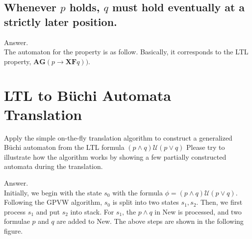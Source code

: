 \documentclass[a4paper,11pt]{article}
\theoremstyle{mytheor}
\begin{document}
\subsection{Whenever $p$ holds, $q$ must hold eventually at a strictly later position.}
Answer.
\smallskip \\
The automaton for the property is as follow. Basically, it corresponds to the LTL property, $\textbf{AG}(p \rightarrow \textbf{XF} q))$.
\begin{center}
\end{center}

\section{LTL to B\"uchi Automata Translation}
Apply the simple on-the-fly translation algorithm to construct a generalized B\"uchi automaton from the LTL formula $(p \land q) \mathcal{U} (p \lor q)$
Please try to illustrate how the algorithm works by showing a few partially constructed automata during the translation.

\noindent Answer.
\smallskip \\
Initially, we begin with the state $s_0$ with the formula $\phi= (p \land q) \mathcal{U} (p \lor q)$.
Following the GPVW algorithm, $s_0$ is split into two states $s_1, s_2$. 
Then, we first process $s_1$ and put $s_2$ into stack. For $s_1$, the $p\land q$ in New is processed,
and two formulae $p$ and $q$ are added to New.
The above steps are shown in the following figure.
\end{document}
